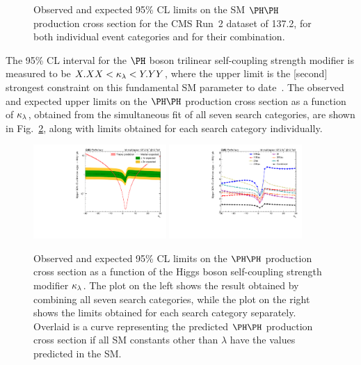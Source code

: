 \begin{figure}
  \centering
  \caption{
    Observed and expected 95\% CL limits on the SM $\HH$ production cross section
    for the CMS Run~2 dataset of 137.2\fbinv, for both individual event categories
    and for their combination.
  }
  \label{fig:HH_limits_SM}
\end{figure}

The 95\% CL interval for the $\PHiggs$ boson trilinear self-coupling strength modifier
is measured to be $X.XX < \kappa_{\lambda} < Y.YY$, where the upper limit is the [second]
strongest constraint on this fundamental SM parameter to date~\cite{Sirunyan:2745738,Sirunyan:2018ayu,2020135103}.
The observed and expected upper limits on the $\HH$ production cross section as a function of
$\kappa_{\lambda}$, obtained from the simultaneous fit of all seven search categories, are shown in Fig.~\ref{fig:HH_limits_kLambda}, 
along with limits obtained for each search category individually.

\begin{figure}
  \centering
  \includegraphics[width=0.45\textwidth]{figures/klscan.pdf}
  \hspace{0.05\textwidth}
  \includegraphics[width=0.45\textwidth]{figures/klMultiscan.pdf}
  \caption{
    Observed and expected 95\% CL limits on the $\HH$ production cross section as
    a function of the Higgs boson self-coupling strength modifier $\kappa_{\lambda}$.
    The plot on the left shows the result obtained by combining all seven search categories,
    while the plot on the right shows the limits obtained for each search category separately.  Overlaid is a curve representing the
    predicted $\HH$ production cross section if all SM constants other than
    $\lambda$ have the values predicted in the SM.
  }
  \label{fig:HH_limits_kLambda}
\end{figure}

